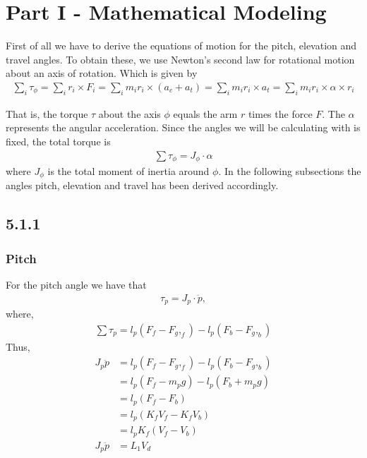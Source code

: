 \section*{Part I - Mathematical Modeling}
First of all we have to derive the equations of motion for the pitch, elevation and travel angles. To obtain these, we use Newton's second law for rotational motion about an axis of rotation. Which is given by
\begin{align*}
\sum_{i}\tau_\phi = \sum_{i}r_i\times F_i = \sum_{i}m_ir_i \times (a_c + a_t) = \sum_{i}m_ir_i \times a_t = \sum_{i}m_ir_i \times \alpha \times r_i
\end{align*} 

That is, the torque $\tau$ about the axis $\phi$ equals the arm $r$ times the force $F$. The $\alpha$ represents the angular acceleration. Since the angles we will be calculating with is fixed, the total torque is  
\begin{align*}
\sum\tau_\phi = J_\phi \cdot \alpha
\end{align*}
where $J_\phi$ is the total moment of inertia around $\phi$. In the following subsections the angles pitch, elevation and travel has been derived accordingly. 
\subsection*{5.1.1}
\subsubsection*{Pitch}
For the pitch angle we have that 
\begin{align*}
\tau_p = J_p\cdot \ddot{p},
\end{align*}
where,
\begin{align*}
\sum \tau_p = l_p(F_f-F_g,_f) - l_p(F_b-F_g,_b)
\end{align*}
Thus,
\begin{align*}
J_p \ddot{p} &= l_p(F_f-F_g,_f) - l_p(F_b-F_g,_b)\\
             &= l_p(F_f-m_pg) - l_p(F_b+ m_pg)\\
             &= l_p(F_f - F_b)\\
             &= l_p(K_fV_f - K_fV_b)\\
             &= l_pK_f(V_f - V_b)\\
J_p\ddot{p}  &= L_1V_d \tag{$2a$}\label{2a}
\end{align*}


